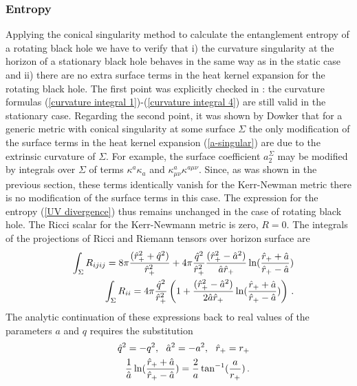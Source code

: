 \documentclass[12pt]{article}
\begin{document}
\subsubsection{Entropy}

Applying the conical singularity method to calculate the entanglement entropy of a rotating black hole we have to verify that i) the curvature singularity at the  horizon of a stationary black hole behaves in the same way as in the static case and ii) there are no extra surface terms  in the heat kernel expansion for the rotating black hole. 
The first point was explicitly checked in \cite{Mann:1996bi}: the curvature formulas (\ref{curvature integral 1})-(\ref{curvature integral 4}) are still valid in the stationary case.
Regarding the second point, it was shown by Dowker \cite{Dowker:1994bj} that  for a generic metric with conical singularity  at  some surface $\Sigma$ 
the only modification of the surface terms in the heat kernel expansion (\ref{a-singular})  are due to the extrinsic curvature of $\Sigma$.
 For example, the surface  coefficient $a_2^\Sigma$ may be modified by integrals over $\Sigma$ of terms $\kappa^a\kappa_a$ and $\kappa^a_{\mu\nu} \kappa^{a\mu\nu}$. Since, as was shown in the previous section, these terms identically vanish for the Kerr-Newman metric there is no modification of the surface terms in this case. The expression for the entropy (\ref{UV divergence}) thus
remains unchanged in the case of rotating black hole. The Ricci scalar for the Kerr-Newmann metric is zero, ${R}=0$.
The integrals of the projections of Ricci and Riemann tensors over horizon surface are
\begin{eqnarray}
&&\int_\Sigma {R}_{ijij}=8\pi{(\hat{r}^2_++\hat{q}^2)\over \hat{r}^2_+}+
4\pi{\hat{q}^2\over \hat{r}^2_+}{(\hat{r}^2_+-\hat{a}^2)\over \hat{a}\hat{r}_+}
\ln ({\hat{r}_++\hat{a}\over \hat{r}_+-\hat{a}}) \nonumber \\
&&\int_\Sigma {R}_{ii}=4\pi{\hat{q}^2\over\hat{r}^2_+}\left( 1 +
{(\hat{r}^2_+-\hat{a}^2)\over 2\hat{a}\hat{r}_+}
\ln ({\hat{r}_++\hat{a}\over \hat{r}_+-\hat{a}})\right)\, .
\label{Ricci-Riemann-KN}
\end{eqnarray}
The analytic continuation of these expressions back to real values
of the parameters $a$ and $q$ requires  the substitution
\begin{eqnarray}
&&\hat{q}^2=-q^2,~~\hat{a}^2=-a^2,~~\hat{r}_+=r_+ \nonumber \\
&&{1\over \hat{a}}\ln ({\hat{r}_++\hat{a}\over \hat{r}_+-\hat{a}})=
{2\over a} \tan^{-1}({a\over r_+})\, .
\label{analytic KN} 
\end{eqnarray}
\end{document}
